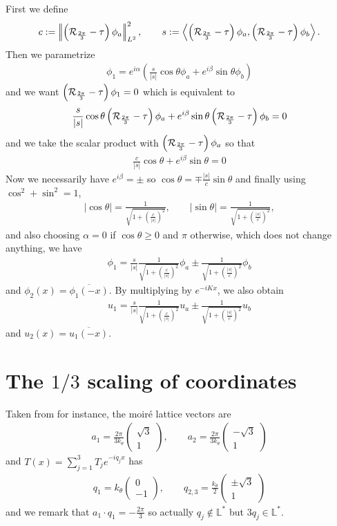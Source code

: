 \documentclass[11pt,a4paper,reqno,french,tikz]{amsart}
\renewcommand{\ge}{\geqslant}\renewcommand{\le}{\leqslant}
\newcommand{\pa}[1]{\left( #1 \right)} %
\newcommand{\ab}[1]{\left|#1\right|} %
\newcommand{\ps}[1]{\left< #1 \right>} %
\newcommand{\nor}[2]{ \left| \! \left| #1 \right| \! \right|_{#2} } %
\newcommand{\f}[2]{\frac{#1}{#2}} %
\newcommand{\mat}[1]{\begin{pmatrix} #1 \end{pmatrix}} %
\def\L{{\mathbb L}}
\begin{document}
First we define
\begin{align*}
c := \nor{\pa{\cR_{\f{2\pi}{3}} -\tau}\phi_a}{L^2}^2, \qquad s := \ps{\pa{\cR_{\f{2\pi}{3}} -\tau}\phi_a,\pa{\cR_{\f{2\pi}{3}} -\tau}\phi_b}.
\end{align*}
Then we parametrize
\begin{align*}
\phi_1 = e^{i \alpha} \pa{\f s{\ab{s}} \cos \theta \phi_a + e^{i\beta} \sin \theta \phi_b}
\end{align*}
and we want $\pa{\cR_{\f{2\pi}{3}} -\tau}\phi_1 = 0$ which is equivalent to
\begin{align*}
\f s{\ab{s}}\cos \theta \pa{\cR_{\f{2\pi}{3}} -\tau}\phi_a + e^{i\beta} \sin \theta \pa{\cR_{\f{2\pi}{3}} -\tau}\phi_b =0
\end{align*}
and we take the scalar product with $\pa{\cR_{\f{2\pi}{3}} -\tau}\phi_a$ so that
\begin{align*}
\f c{\ab{s}}\cos \theta  + e^{i\beta} \sin \theta =0
\end{align*}
Now we necessarily have $e^{i\beta} = \pm$ so $\cos \theta = \mp \f {\ab{s}}c \sin \theta$ and finally using $\cos^2 + \sin^2 = 1$,
\begin{align*}
\ab{\cos \theta} = \f 1{\sqrt{1+ \pa{\f c{\ab{s}}}^2}}, \qquad \ab{\sin \theta} = \f 1{\sqrt{1+ \pa{\f {\ab{s}}c}^2}},
\end{align*}
and also choosing $\alpha = 0$ if $\cos \theta \ge 0$ and $\pi$ otherwise, which does not change anything, we have
\begin{align*}
\phi_1 = \f{s}{\ab{s}}\f 1{\sqrt{1+ \pa{\f c{\ab{s}}}^2}} \phi_a \pm \f 1{\sqrt{1+ \pa{\f {\ab{s}}c}^2}} \phi_b
\end{align*}
and $\phi_2(x) = \overline{\phi_1(-x)}$. By multiplying by $e^{-iKx}$, we also obtain
\begin{align*}
\boxed{u_1 = \f{s}{\ab{s}}\f 1{\sqrt{1+ \pa{\f c{\ab{s}}}^2}} u_a \pm \f 1{\sqrt{1+ \pa{\f {\ab{s}}c}^2}} u_b}
\end{align*}
and $u_2(x) = \overline{u_1(-x)}$.


\section{The $1/3$ scaling of coordinates}%
\label{sec:the_1_3_scaling_of_coordinates}

Taken from \cite[Appendix G.3, G.4]{WatLus21} for instance, the moiré lattice vectors are 
\begin{align*}
a_1 = \f{2\pi}{3k_\theta} \mat{\sqrt 3 \\ 1},\qquad a_2 = \f{2\pi}{3k_\theta} \mat{-\sqrt 3 \\ 1}
\end{align*}
and $T(x) = \sum_{j=1}^3 T_j e^{-iq_j x}$ has 
\begin{align*}
q_1 = k_\theta \mat{0 \\ -1},\qquad q_{2,3} = \f{k_\theta}{2} \mat{\pm \sqrt 3 \\ 1}
\end{align*}
and we remark that $a_1 \cdot q_1 = -\f{2\pi}{3}$ so actually $q_j \not\in \L^*$ but $3 q_j \in \L^*$.
\end{document}
